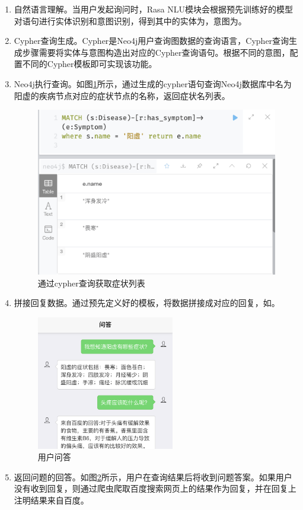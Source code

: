 \begin{enumerate}
    \item 自然语言理解。当用户发起询问时，Rasa NLU模块会根据预先训练好的模型对语句进行实体识别和意图识别，得到其中的实体为，意图为。

    \item Cypher查询生成。Cypher是Neo4j用户查询图数据的查询语言，Cypher查询生成步骤需要将实体与意图构造出对应的Cypher查询语句。根据不同的意图，配置不同的Cypher模板即可实现该功能。

    \item Neo4j执行查询。如图\ref{fig:cypher}所示，通过生成的cypher语句查询Neo4j数据库中名为阳虚的疾病节点对应的症状节点的名称，返回症状名列表。

    \begin{figure}[h]
        \centering
        \includegraphics[width=12cm]{images/query.png}
        \caption{通过cypher查询获取症状列表}
        \label{fig:cypher}
    \end{figure}

    \item 拼接回复数据。通过预先定义好的模板，将数据拼接成对应的回复，如。

    \begin{figure}[h]
        \centering
        \includegraphics[width=6cm]{images/qa2.png}
        \caption{用户问答}
        \label{fig:qa}
    \end{figure}

    \item 返回问题的回答。如图\ref{fig:qa}所示，用户在查询结果后将收到问题答案。如果用户没有收到回复，则通过爬虫爬取百度搜索网页上的结果作为回复，并在回复上注明结果来自百度。

\end{enumerate}



